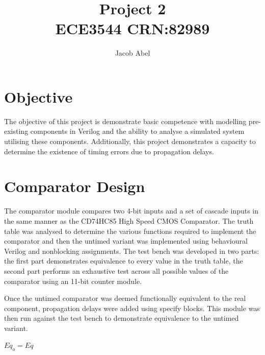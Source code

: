 \documentclass[12pt,letterpaper,titlepage]{article}
\author{Jacob Abel}
\title{	Project 2
	\\\large ECE3544 CRN:82989
}
\begin{document}


\maketitle
\begin{raggedright}

\section*{Objective}
The objective of this project is demonstrate basic competence with modelling pre-existing components in Verilog and the ability to analyse a simulated system utilising these components. Additionally, this project demonstrates a capacity to determine the existence of timing errors due to propagation delays.

\section{Comparator Design}

The comparator module compares two 4-bit inputs and a set of cascade inputs in the same manner as the CD74HC85 High Speed CMOS Comparator. The truth table was analysed to determine the various functions required to implement the comparator and then the untimed variant was implemented using behavioural Verilog and nonblocking assignments. The test bench was developed in two parts: the first part demonstrates equivalence to every value in the truth table, the second part performs an exhaustive test across all possible values of the comparator using an 11-bit counter module.

Once the untimed comparator was deemed functionally equivalent to the real component, propagation delays were added using specify blocks. This module was then run against the test bench to demonstrate equivalence to the untimed variant.

\begin{paracol}{3}
\centering
{}

$Eq_o = Eq$
\switchcolumn
\centering
{}


\end{paracol}
\end{raggedright}
\end{document}
